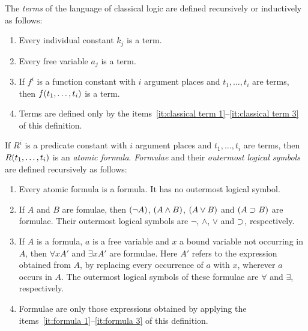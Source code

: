 \documentclass[11pt,a4paper]{article}
\begin{document}
\begin{definition}[Term]%
    \label{def:classical term}
    The \emph{terms} of the language of classical logic are defined recursively or inductively as follows:
    \begin{enumerate}
        \item\label{it:classical term 1}
            Every individual constant \(k_j\) is a term.
        \item\label{it:classical term 2}
            Every free variable \(a_j\) is a term.
        \item\label{it:classical term 3}
            If \(f^i\) is a function constant with \(i\) argument places and \(t_1,\ldots,t_i\) are terms,
            then \(f(t_1,\ldots,t_i)\) is a term.
        \item\label{it:classical term4}
            Terms are defined only by the items~\ref{it:classical term 1}--\ref{it:classical term 3} of this definition.
    \end{enumerate}
\end{definition}

\begin{definition}%
    \label{def:formulae and outermost logical symbols}
    If \(R^i\) is a predicate constant with \(i\) argument places and \(t_1,\ldots,t_i\) are terms,
    then \(R(t_1,\ldots,t_i)\) is an \emph{atomic formula}.
    \emph{Formulae} and their \emph{outermost logical symbols} are defined recursively as follows:
    \begin{enumerate}
        \item\label{it:formula 1}
            Every atomic formula is a formula. It has no outermost logical symbol.
        \item\label{it:formula 2}
            If \(A\) and \(B\) are fomulae, then \((\lnot A)\), \((A\land B)\),
            \((A\lor B)\) and \((A\supset B)\) are formulae.
            Their outermost logical symbols are \(\lnot\), \(\land\), \(\lor\) and \(\supset\),
            respectively.
        \item\label{it:formula 3}
            If \(A\) is a formula, \(a\) is a free variable and \(x\) a bound variable not occurring in \(A\),
            then \(\forall x A'\) and \(\exists x A'\) are formulae.
            Here \(A'\) refers to the expression obtained from \(A\),
            by replacing every occurrence of \(a\) with \(x\), wherever \(a\)
            occurs in \(A\).
            The outermost logical symbols of these formulae are \(\forall\) and \(\exists\), respectively.
        \item\label{it:formula 4}
            Formulae are only those expressions obtained by applying the items~\ref{it:formula 1}--\ref{it:formula 3}
            of this definition.
    \end{enumerate}
\end{definition}
\end{document}
